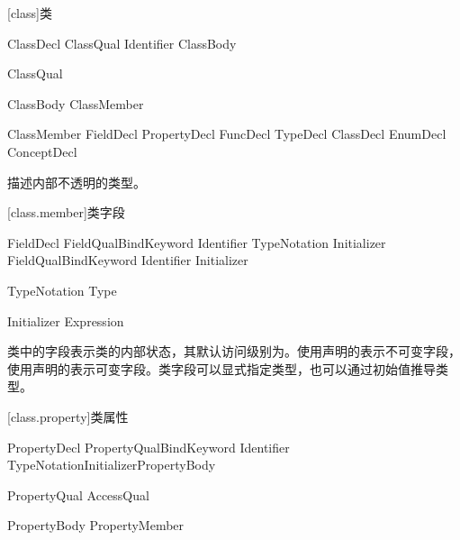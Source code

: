 
[class]{类}

\begin{bnf}{ClassDecl}
    ClassQual\bnfs {} Identifier ClassBody
\end{bnf}

\begin{bnf}{ClassQual}
\end{bnf}

\begin{bnf}{ClassBody}
    \terminal{\{} ClassMember\bnfs \terminal{\}}
\end{bnf}

\begin{bnf}{ClassMember}
    FieldDecl \br
    PropertyDecl \br
    FuncDecl \br
    TypeDecl \br
    ClassDecl \br
    EnumDecl \br
    ConceptDecl
\end{bnf}

\pnum
{}描述内部不透明的类型。

[class.member]{类字段}

\begin{bnf}{FieldDecl}
    FieldQual\bnfs BindKeyword Identifier TypeNotation Initializer\bnfq \terminal{;}
    FieldQual\bnfs BindKeyword Identifier Initializer \terminal{;}
\end{bnf}

\begin{bnf}{TypeNotation}
    \terminal{:} Type
\end{bnf}

\begin{bnf}{Initializer}
    \terminal{=} Expression
\end{bnf}

\pnum
类中的字段表示类的内部状态，其默认访问级别为。使用声明的表示不可变字段，使用声明的表示可变字段。类字段可以显式指定类型，也可以通过初始值推导类型。

[class.property]{类属性}

\begin{bnf}{PropertyDecl}
    PropertyQual\bnfs BindKeyword Identifier TypeNotation\bnfq Initializer\bnfq PropertyBody \terminal{;}
\end{bnf}

\begin{bnf}{PropertyQual}
    AccessQual
\end{bnf}

\begin{bnf}{PropertyBody}
    \terminal{\{} PropertyMember\bnfp \terminal{\}}
\end{bnf}

